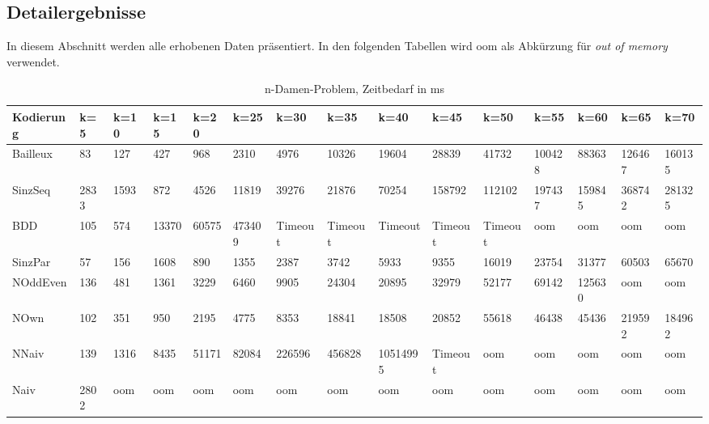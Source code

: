 \documentclass[a4,abstract=on]{scrartcl}
\newcommand*\stdsection{}
\let\stdsection\section
\renewcommand*\section{%
    \clearpage\ifodd\value{page}\else\mbox{}\clearpage\fi
    \stdsection}
\begin{document}
\begin{landscape}
	\section{Detailergebnisse}\label{anhang}
 In diesem Abschnitt werden alle erhobenen Daten präsentiert. In den folgenden Tabellen wird oom als Abkürzung für \textit{out of memory} verwendet.


	 \begin{table}[h!]
    \small
    \setlength{\tabcolsep}{0.11cm}
     \centering
     \begin{tabular}[width=\textwidth]{|l||l|l|l|l|l|l|l|l|l|l|l|l|l|l|}
	\hline
       \textbf{Kodierung}  & \textbf{k=5} & \textbf{k=10} & \textbf{k=15} &\textbf{k=20} &\textbf{k=25} &\textbf{k=30} &\textbf{k=35} &\textbf{k=40} &\textbf{k=45} &\textbf{k=50} &\textbf{k=55} &\textbf{k=60} &\textbf{k=65} &\textbf{k=70}\\
	\hline
	\hline
	Bailleux & 83 & 127 & 427 & 968 & 2310 & 4976 & 10326 & 19604 & 28839 & 41732 & 100428 & 88363 & 126467 & 160135\\
\hline
	SinzSeq & 2833 & 1593 & 872 & 4526 & 11819 & 39276 & 21876 & 70254 & 158792 & 112102 & 197437 & 159845 & 368742 & 281325 \\
\hline
	BDD & 105 & 574 & 13370 & 60575 & 473409 & Timeout & Timeout &Timeout &Timeout &Timeout & oom & oom & oom & oom\\
\hline
	SinzPar & 57 & 156 & 1608 & 890 & 1355 & 2387 & 3742 & 5933 & 9355 & 16019 & 23754 & 31377 & 60503 & 65670 \\
\hline
	NOddEven & 136 & 481 & 1361 & 3229 & 6460 & 9905 & 24304 & 20895 & 32979 & 52177& 69142 & 125630 & oom & oom\\
\hline
	NOwn & 102 & 351 & 950 & 2195 & 4775 & 8353& 18841 & 18508 & 20852 & 55618 & 46438 & 45436 & 219592 & 184962\\
 \hline
	NNaiv & 139 & 1316 & 8435 & 51171 & 82084 & 226596 & 456828 & 10514995 & Timeout & oom & oom & oom & oom & oom\\
\hline
	Naiv & 2802 & oom &  oom &  oom &  oom &  oom &  oom &  oom &  oom &  oom &  oom &  oom &  oom &  oom\\
\hline
       
     \end{tabular}

     \caption{n-Damen-Problem, Zeitbedarf in ms}
     \label{tbl:beispieltabelle}


\end{table}
\end{landscape}
\end{document}
